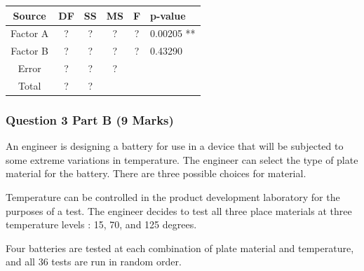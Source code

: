 \documentclass[a4paper,12pt]{article}
\begin{document}
\begin{center}
	\begin{tabular}{|c||c|c|c|c|l|}
		\hline Source & DF & SS & MS & F & p-value \\ \hline 
		\hline Factor A & \phantom{mak} ? \phantom{mak}  & \phantom{mak} ? \phantom{mak}  & \phantom{mak} ? \phantom{mak}  & \phantom{mak} ? \phantom{mak}  &0.00205 ** \\ \hline
				\hline Factor B & \phantom{mak} ? \phantom{mak}  & \phantom{mak} ? \phantom{mak}  & \phantom{mak} ? \phantom{mak}  & \phantom{mak} ? \phantom{mak}  & 0.43290    \\ \hline
		\hline Error &  ? & ? & \phantom{mak} ? \phantom{mak}  &  &  \\ 
		\hline \hline Total & ? & ? &  &  &  \\ 
		\hline 
	\end{tabular}
\end{center} 

\newpage
\subsubsection*{Question 3 Part B (9 Marks)}


An engineer is designing a battery for use in a device that will be subjected to some extreme variations in temperature. The engineer can select the type of plate material for the battery. There are three possible choices for material. 

\bigskip 


\noindent Temperature can be controlled in the product development laboratory for the purposes of a test.  The engineer decides to test all three place materials at three temperature levels : 15, 70, and 125 degrees. 





\bigskip 


\noindent Four batteries are tested at each combination of plate material and temperature, and all 36 tests are run in random order.
\end{document}

